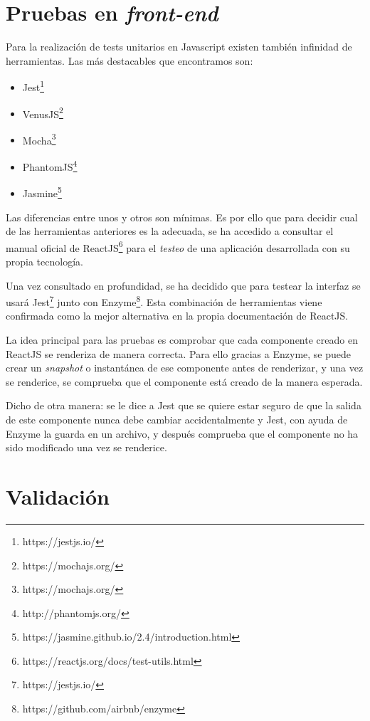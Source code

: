 \section{Pruebas en \textit{front-end}}

Para la realización de tests unitarios en Javascript existen también infinidad de herramientas. Las más destacables que encontramos son:

\begin{itemize}
    \item Jest\footnote{https://jestjs.io/}
    \item VenusJS\footnote{https://mochajs.org/}
    \item Mocha\footnote{https://mochajs.org/}
    \item PhantomJS\footnote{http://phantomjs.org/}
    \item Jasmine\footnote{https://jasmine.github.io/2.4/introduction.html}
\end{itemize}

Las diferencias entre unos y otros son mínimas. Es por ello que para decidir cual de las herramientas anteriores es la adecuada, se ha accedido a consultar el manual oficial de ReactJS\footnote{https://reactjs.org/docs/test-utils.html} para el \textit{testeo} de una aplicación desarrollada con su propia tecnología. 

Una vez consultado en profundidad, se ha decidido que para testear la interfaz se usará Jest\footnote{https://jestjs.io/} junto con Enzyme\footnote{https://github.com/airbnb/enzyme}. Esta combinación de herramientas viene confirmada como la mejor alternativa en la propia documentación de ReactJS\cite{testreact}.

La idea principal para las pruebas es comprobar que cada componente creado en ReactJS se renderiza de manera correcta. Para ello gracias a Enzyme, se puede crear un \textit{snapshot} o instantánea de ese componente antes de renderizar, y una vez se renderice, se comprueba que el componente está creado de la manera esperada\cite{testreact2}.

Dicho de otra manera: se le dice a Jest que se quiere estar seguro de que la salida de este componente nunca debe cambiar accidentalmente y Jest, con ayuda de Enzyme la guarda en un archivo, y después comprueba que el componente no ha sido modificado una vez se renderice.

\section{Validación}

